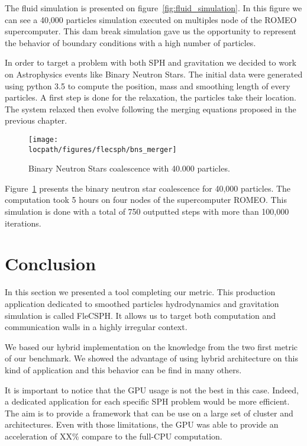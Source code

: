 The fluid simulation is presented on figure~\ref{fig:fluid_simulation}.
In this figure we can see a 40,000 particles simulation executed on multiples node of the ROMEO supercomputer. 
This dam break simulation gave us the opportunity to represent the behavior of boundary conditions with a high number of particles. 

In order to target a problem with both SPH and gravitation we decided to work on Astrophysics events like Binary Neutron Stars.
The initial data were generated using python 3.5 to compute the position, mass and smoothing length of every particles. 
A first step is done for the relaxation, the particles take their location. 
The system relaxed then evolve following the merging equations proposed in the previous chapter. 
\begin{figure}[t!]
\centering
\texttt{[image: \\locpath/figures/flecsph/bns\_merger]}
\caption{Binary Neutron Stars coalescence with 40.000 particles.}
\label{fig:bns_simulation}
\end{figure}

Figure~\ref{fig:bns_simulation} presents the binary neutron star coalescence for 40,000 particles. 
The computation took 5 hours on four nodes of the supercomputer ROMEO. 
This simulation is done with a total of 750 outputted steps with more than 100,000 iterations. 

\section{Conclusion}
In this section we presented a tool completing our metric. 
This production application dedicated to smoothed particles hydrodynamics and gravitation simulation is called FleCSPH. 
It allows us to target both computation and communication walls in a highly irregular context.

We based our hybrid implementation on the knowledge from the two first metric of our benchmark.
We showed the advantage of using hybrid architecture on this kind of application and this behavior can be find in many others. 

It is important to notice that the GPU usage is not the best in this case. 
Indeed, a dedicated application for each specific SPH problem would be more efficient. 
The aim is to provide a framework that can be use on a large set of cluster and architectures. 
Even with those limitations, the GPU was able to provide an acceleration of XX\% compare to the full-CPU computation.
 
